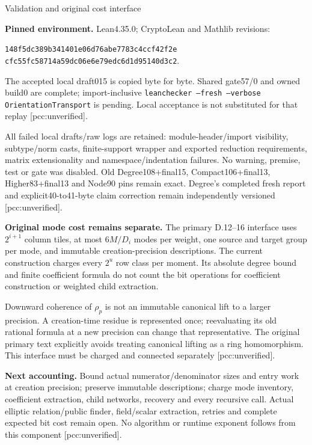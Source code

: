 \documentclass[10pt]{article}
\begin{document}
\newpage
\begin{center}{\Large Validation and original cost interface}\end{center}
\textbf{Pinned environment.} Lean4.35.0; CryptoLean and Mathlib revisions:
\begin{center}\small
\texttt{148f5dc389b341401e06d76abe7783c4ccf42f2e}\\
\texttt{cfc55fc58714a59dc06e6e79edc6d1d95140d3c2}.
\end{center}
The accepted local draft015 is copied byte for byte. Shared gate57/0 and
owned build0 are complete; import-inclusive
\texttt{leanchecker --fresh --verbose OrientationTransport} is pending.
Local acceptance is not substituted for that replay [pcc:unverified].

All failed local drafts/raw logs are retained: module-header/import visibility,
subtype/norm casts, finite-support wrapper and exported reduction requirements,
matrix extensionality and namespace/indentation failures. No warning, premise,
test or gate was disabled. Old Degree108+final15, Compact106+final13,
Higher83+final13 and Node90 pins remain exact. Degree's completed fresh report
and explicit40-to41-byte claim correction remain independently versioned
[pcc:unverified].

\textbf{Original mode cost remains separate.} The primary D.12--16 interface
uses $2^{i+1}$ column tiles, at most $6M/D_i$ modes per weight, one source
and target group per mode, and immutable creation-precision descriptions.
The current construction charges every $2^u$ row class per moment. Its
absolute degree bound and finite coefficient formula do not count the bit
operations for coefficient construction or weighted child extraction.

Downward coherence of $\rho_p$ is not an immutable canonical lift to a larger
precision. A creation-time residue is represented once; reevaluating its old
rational formula at a new precision can change that representative. The
original primary text explicitly avoids treating canonical lifting as a
ring homomorphism. This interface must be charged and connected separately
[pcc:unverified].

\textbf{Next accounting.} Bound actual numerator/denominator sizes and entry
work at creation precision; preserve immutable descriptions; charge mode
inventory, coefficient extraction, child networks, recovery and every
recursive call. Actual elliptic relation/public finder, field/scalar
extraction, retries and complete expected bit cost remain open. No algorithm
or runtime exponent follows from this component [pcc:unverified].
\end{document}
